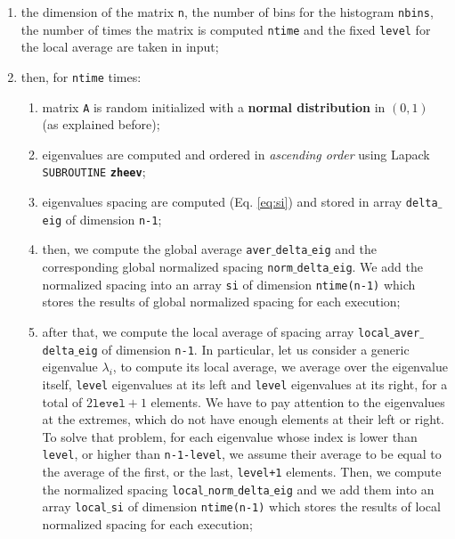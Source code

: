 \documentclass[rmp,10pt,onecolumn,fleqn,notitlepage]{revtex4-1}
\begin{document}
\begin{enumerate}
\item the dimension of the matrix \texttt{n}, the number of bins for the histogram \texttt{nbins}, the number of times the matrix is computed \texttt{ntime} and the fixed \texttt{level} for the local average are taken in input;
\item then, for \texttt{ntime} times:

    \begin{enumerate}
    \item matrix \texttt{A} is random initialized with a \textbf{normal distribution} in \( (0,1) \) (as explained before);

    \item eigenvalues are computed and ordered in \emph{ascending order} using Lapack \texttt{SUBROUTINE} {\bfseries\texttt{zheev}};

    \item eigenvalues spacing are computed (Eq. \eqref{eq:si}) and stored in array \texttt{delta$\_$eig} of dimension \texttt{n-1};

    \item then, we compute the global average \texttt{aver$\_$delta$\_$eig} and the corresponding global normalized spacing \texttt{norm$\_$delta$\_$eig}. We add the normalized spacing into an array \texttt{si} of dimension \texttt{ntime(n-1)} which stores the results of global normalized spacing for each execution;

    \item after that, we compute the local average of spacing array \texttt{local$\_$aver$\_$delta$\_$eig} of dimension \texttt{n-1}. In particular, let us consider a generic eigenvalue \( \lambda _i \), to compute its local average, we average over the eigenvalue itself, \texttt{level} eigenvalues at its left and \texttt{level} eigenvalues at its right, for a total of \( 2  \texttt{level} + 1 \) elements.
    We have to pay attention to the eigenvalues at the extremes, which do not have enough elements at their left or right. To solve that problem, for each eigenvalue whose index is lower than \texttt{level}, or higher than \texttt{n-1-level}, we assume their average to be equal to the average of the first, or the last, \texttt{level+1} elements. Then, we compute the normalized spacing \texttt{local$\_$norm$\_$delta$\_$eig} and we add them into an array \texttt{local$\_$si} of dimension \texttt{ntime(n-1)} which stores the results of local normalized spacing for each execution;



\end{enumerate}
\end{enumerate}
\end{document}

